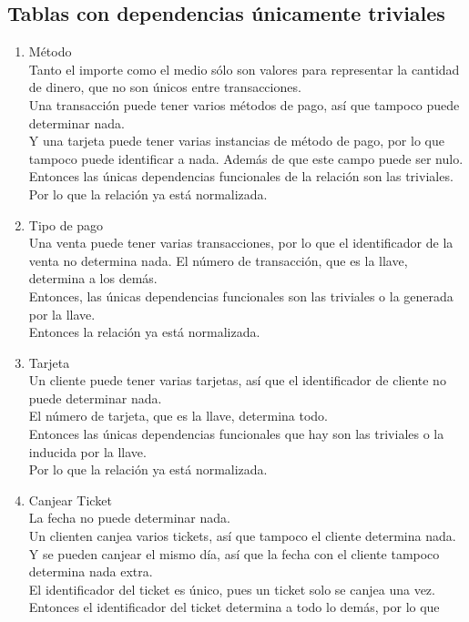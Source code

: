 \documentclass[10pt]{article}
\begin{document}
\subsection{Tablas con dependencias únicamente triviales}
\begin{enumerate}
	\item Método\\
	Tanto el importe como el medio sólo son valores para representar la cantidad
	de dinero, que no son únicos entre transacciones.\\
	Una transacción puede tener varios métodos de pago, así que tampoco
	puede determinar nada.\\
	Y una tarjeta puede tener varias instancias de método de pago, por lo que
	tampoco puede identificar a nada. Además de que este campo puede ser nulo.\\
	Entonces las únicas dependencias funcionales de la relación son las
	triviales.\\
	Por lo que la relación ya está normalizada.
	\item Tipo de pago \\
	Una venta puede tener varias transacciones, por lo que el identificador de
	la venta no determina nada. El número de transacción, que es la llave, 
	determina a los demás.\\
	Entonces, las únicas dependencias funcionales son las triviales o la
	generada por la llave.\\
	Entonces la relación ya está normalizada.
	\item Tarjeta \\
	Un cliente puede tener varias tarjetas, así que el identificador de cliente 
	no puede determinar nada. \\
	El número de tarjeta, que es la llave, determina todo. \\
	Entonces las únicas dependencias funcionales que hay son las triviales o la
	inducida por la llave.\\
	Por lo que la relación ya está normalizada.
	\item Canjear Ticket \\
	La fecha no puede determinar nada. \\ 
	Un clienten canjea varios tickets, así que tampoco el cliente determina
	nada. Y se pueden canjear el mismo día, así que la fecha con el cliente
	tampoco determina nada extra.\\
	El identificador del ticket es único, pues un ticket solo se canjea una vez.
	Entonces el identificador del ticket determina a todo lo demás, por lo que

\end{enumerate}
\end{document}
